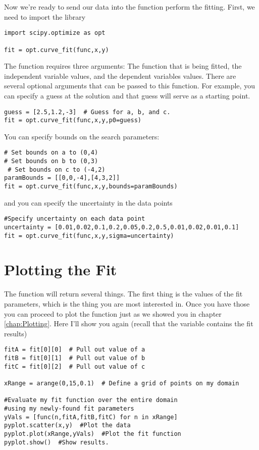 Now we're ready to send our data into the function 
perform the fitting. First, we need to import the library
\begin{Verbatim}
import scipy.optimize as opt

fit = opt.curve_fit(func,x,y)
\end{Verbatim}
The  function requires three arguments: The function
that is being fitted, the independent variable values, and the
dependent variables values.  There are several optional arguments that
can be passed to this function.  For example, you can specify a guess
at the solution and that guess will serve as a starting
point.
\begin{Verbatim}
guess = [2.5,1.2,-3]  # Guess for a, b, and c.
fit = opt.curve_fit(func,x,y,p0=guess)
\end{Verbatim}
You can specify bounds on the search parameters:
\begin{Verbatim}
# Set bounds on a to (0,4)
# Set bounds on b to (0,3)
 # Set bounds on c to (-4,2)
paramBounds = [[0,0,-4],[4,3,2]] 
fit = opt.curve_fit(func,x,y,bounds=paramBounds)
\end{Verbatim}
and you can specify the uncertainty in the data points
\begin{Verbatim}
#Specify uncertainty on each data point
uncertainty = [0.01,0.02,0.1,0.2,0.05,0.2,0.5,0.01,0.02,0.01,0.1]  
fit = opt.curve_fit(func,x,y,sigma=uncertainty)
\end{Verbatim}

\section{Plotting the Fit}
The function  will return several things.  The
first thing is the values of the fit parameters, which is the thing
you are most interested in.  Once you have those you can proceed to
plot the function just as we showed you in chapter \ref{chap:Plotting}.
Here I'll show you again (recall that the variable 
contains the fit results)
\begin{Verbatim}
fitA = fit[0][0]  # Pull out value of a
fitB = fit[0][1]  # Pull out value of b
fitC = fit[0][2]  # Pull out value of c

xRange = arange(0,15,0.1)  # Define a grid of points on my domain

#Evaluate my fit function over the entire domain
#using my newly-found fit parameters
yVals = [func(n,fitA,fitB,fitC) for n in xRange] 
pyplot.scatter(x,y)  #Plot the data
pyplot.plot(xRange,yVals)  #Plot the fit function
pyplot.show()  #Show results.
\end{Verbatim}
